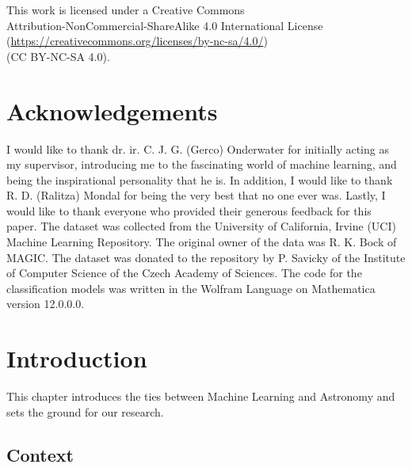 \documentclass[a4paper, 12pt]{report}
\theoremstyle{definition}
\begin{document}
\vspace{1,5cm}


\begin{center}
    This work is licensed under a Creative Commons \\
    Attribution-NonCommercial-ShareAlike 4.0 International License \\
    (\url{https://creativecommons.org/licenses/by-nc-sa/4.0/}) \\
    (CC BY-NC-SA 4.0). \\
\end{center}

\newpage

\chapter*{Acknowledgements}

I would like to thank dr. ir. C. J. G. (Gerco) Onderwater for initially acting as my supervisor, introducing me to the fascinating world of machine learning, and being the inspirational personality that he is. In addition, I would like to thank R. D. (Ralitza) Mondal for being the very best that no one ever was. Lastly, I would like to thank everyone who provided their generous feedback for this paper. The dataset was collected from the University of California, Irvine (UCI) Machine Learning Repository. \autocite{repository} The original owner of the data was R. K. Bock of MAGIC. The dataset was donated to the repository by P. Savicky of the Institute of Computer Science of the Czech Academy of Sciences. The code for the classification models was written in the Wolfram Language on Mathematica version 12.0.0.0. \autocite{wolmat}
\newpage

\tableofcontents

\chapter{Introduction}

This chapter introduces the ties between Machine Learning and Astronomy and sets the ground for our research.

\section{Context}
\end{document}
